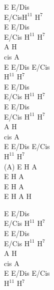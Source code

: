 \begin{chord}
    E E/Dis\\
    E/Cis$\mathrm{H^{11}}$ $\mathrm{H^7}$\\
    E E/Dis\\
    E/Cis $\mathrm{H^{11}}$ $\mathrm{H^7}$\\
    A H\\
    cis A\\
    E E/Dis E/Cis\\
    $\mathrm{H^{11}}$ $\mathrm{H^7}$\\
    E E/Dis\\
    E/Cis $\mathrm{H^{11}}$ $\mathrm{H^7}$\\
    E E/Dis\\
    E/Cis $\mathrm{H^{11}}$ $\mathrm{H^7}$\\
    A H\\
    cis A\\
    E E/Dis E/Cis\\
    $\mathrm{H^{11}}$ $\mathrm{H^7}$\\
    (A) E H A\\
    E H A\\
    E H A\\
    E H A H

    \hfill\break
    E E/Dis\\
    E/Cis $\mathrm{H^{11}}$ $\mathrm{H^7}$\\
    E E/Dis\\
    E/Cis $\mathrm{H^{11}}$ $\mathrm{H^7}$\\
    A H\\
    cis A\\
    E E/Dis E/Cis\\
    $\mathrm{H^{11}}$ $\mathrm{H^7}$
\end{chord}

